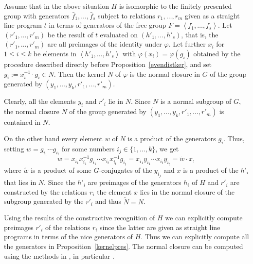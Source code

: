 \begin{Prop}
\label{kernelpres}
Assume that in the above situation $H$ is isomorphic to the
finitely presented group with generators $\bar f_1, \ldots, \bar f_s$
subject to relations $r_1, \ldots, r_m$ given as a straight line
%
program $t$ in terms of generators of the free group $F=\left< f_1, \ldots,
f_s\right>$. Let $(r'_1, \ldots,
r'_m)$ be the result of $t$ evaluated on $(h'_1, \ldots, h'_s)$, that is,
the $(r'_1, \ldots, r'_m)$ are all preimages of the identity under $\varphi$. 
Let further $x_i$ for $1 \le i \le k$ be elements in $\left< h'_1, \ldots, 
h'_s \right>$ with $\varphi(x_i) = \varphi(g_i)$ obtained by the procedure 
described directly before Proposition~\ref{evendistker}, and set 
$y_i := x_i^{-1} \cdot g_i \in N$. Then the kernel $N$ of
$\varphi$ is the normal closure in $G$ of the group generated by
$(y_1, \ldots, y_k, r'_1, \ldots, r'_m)$.
\end{Prop}
\proofbeg
Clearly, all the elements $y_i$ and $r'_i$ lie in $N$. Since $N$ is a
normal subgroup of $G$, the normal closure $\tilde N$ of the group generated
by $(y_1, \ldots, y_k, r'_1, \ldots, r'_m)$ is contained in $N$.

On the other hand every element $w$ of $N$ is a product of the generators
$g_i$. Thus, setting $w = g_{i_1} \cdots g_{i_t}$ for some numbers
$i_j \in \{ 1, \ldots, k \}$, we get
\[ w = x_{i_1} x_{i_1}^{-1} g_{i_1} \cdots x_{i_t} x_{i_t}^{-1} g_{i_t}
     = x_{i_1} y_{i_1} \cdots x_{i_t} y_{i_t}
     = \tilde w \cdot x, \]
where $\tilde w$ is a product of some $G$-conjugates of the $y_{i_j}$
and $x$ is a product of the $h'_i$ that lies in $N$. Since the $h'_i$
are preimages of the generators $h_i$ of $H$ and $r'_i$ are constructed
by the relations $r_i$ the element $x$ lies in the normal closure
of the subgroup generated by the $r'_i$ and thus $\tilde N = N$.
\proofend

\begin{Rem}
Using the results of the constructive recognition of $H$ we
can explicitly compute preimages $r'_i$ of the relations $r_i$ since
the latter are given as straight line programs in terms of the nice
%
generators of $H$. Thus we can explicitly compute all the generators in
Proposition~\ref{kernelpres}. The normal closure can be computed using
the methods in \cite[Chapter 2]{Ser}, in particular
\cite[Theorem~2.3.9]{Ser}.
\end{Rem}

